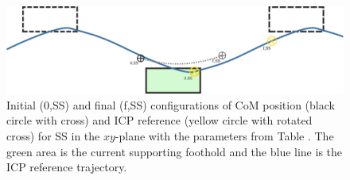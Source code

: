 \begin{figure}[h]
\centering
  \includegraphics[width=.8\linewidth]{STYLESTUFF/ICPplan3StepComICPrSS.png}
   \caption{Initial (0,SS) and final (f,SS) configurations of \ac{CoM} position (black circle with cross) and \ac{ICP} reference (yellow circle with rotated cross) for \ac{SS} in the $xy$-plane with the parameters from Table . The green area is the current supporting foothold and the blue line is the \ac{ICP} reference trajectory.}
    \label{fig:3foot}
\end{figure}


